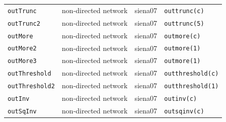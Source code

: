 \begin{longtable}{@{}p{2.6cm}p{3.2cm}p{2.9cm}p{5.4cm}@{}}
\texttt{outTrunc} & non-directed network & siena07 & \texttt{outtrunc(c)}\\
\texttt{outTrunc2} & non-directed network & siena07 & \texttt{outtrunc(5)}\\
\texttt{outMore} & non-directed network & siena07 & \texttt{outmore(c)}\\
\texttt{outMore2} & non-directed network & siena07 & \texttt{outmore(1)}\\
\texttt{outMore3} & non-directed network & siena07 & \texttt{outmore(1)}\\
\texttt{outThreshold} & non-directed network & siena07 & \texttt{outthreshold(c)}\\
\texttt{outThreshold2} & non-directed network & siena07 & \texttt{outthreshold(1)}\\
\texttt{outInv} & non-directed network & siena07 & \texttt{outinv(c)}\\
\texttt{outSqInv} & non-directed network & siena07 & \texttt{outsqinv(c)}\\
\bottomrule
\end{longtable}
\normalsize

